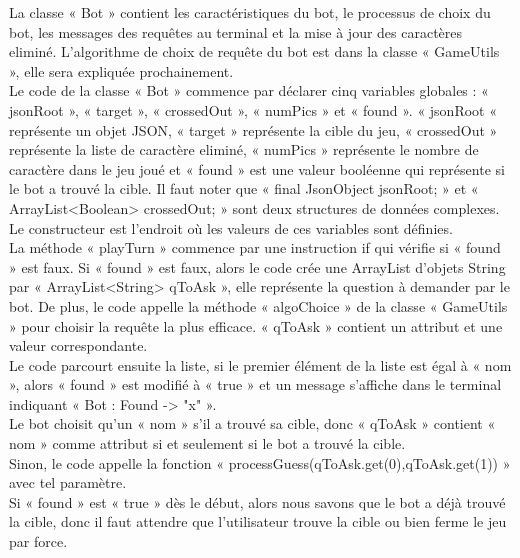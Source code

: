 \documentclass[a4paper]{article}
\begin{document}
La classe « Bot » contient les caractéristiques du bot, le processus de choix du bot, les messages des requêtes au terminal et la mise à jour des caractères eliminé. L’algorithme de choix de requête du bot est dans la classe « GameUtils », elle sera expliquée prochainement.\\

Le code de la classe « Bot » commence par déclarer cinq variables globales : « jsonRoot », « target », « crossedOut », « numPics » et « found ». « jsonRoot «  représente un objet JSON, « target » représente la cible du jeu, « crossedOut » représente la liste de caractère eliminé, « numPics » représente le nombre de caractère dans le jeu joué et « found » est une valeur booléenne qui représente si le bot a trouvé la cible. Il faut noter que « final JsonObject jsonRoot; » et « ArrayList<Boolean> crossedOut; » sont deux structures de données complexes. Le constructeur est l'endroit où les valeurs de ces variables sont définies.\\

La méthode « playTurn » commence par une instruction if qui vérifie si « found » est faux. Si « found » est faux, alors le code crée une ArrayList d'objets String par « ArrayList<String> qToAsk », elle représente la question à demander par le bot. De plus, le code appelle la méthode « algoChoice » de la classe « GameUtils » pour choisir la requête la plus efficace. « qToAsk » contient un attribut et une valeur correspondante.\\
Le code parcourt ensuite la liste, si le premier élément de la liste est égal à « nom », alors « found » est modifié à « true » et un message s'affiche dans le terminal indiquant « Bot : Found -> "x" ».\\
Le bot choisit qu’un « nom » s’il a trouvé sa cible, donc « qToAsk » contient « nom » comme attribut si et seulement si le bot a trouvé la cible.\\
Sinon, le code appelle la fonction « processGuess(qToAsk.get(0),qToAsk.get(1)) » avec tel paramètre.\\
Si « found » est « true » dès le début, alors nous savons que le bot a déjà trouvé la cible, donc il faut attendre que l’utilisateur trouve la cible ou bien ferme le jeu par force.\\
\end{document}
